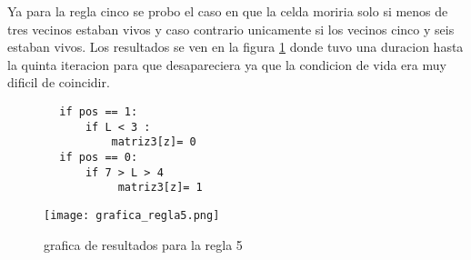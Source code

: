 \documentclass[a4paper, 11pt]{article}
\begin{document}
Ya para la regla cinco se probo el caso en que la celda moriria solo si menos de tres vecinos estaban vivos y caso contrario unicamente si los vecinos cinco y seis estaban vivos. Los resultados se ven en la figura \ref{regla5} donde tuvo una duracion hasta la quinta iteracion para que desapareciera ya que la condicion de vida era muy dificil de coincidir.
\begin{verbatim}
        if pos == 1:  
            if L < 3 : 
                matriz3[z]= 0           
        if pos == 0:
            if 7 > L > 4
                 matriz3[z]= 1 
\end{verbatim}

\begin{figure}[H]
  \centering      
  \caption{grafica de resultados para la regla 5}  
  \texttt{[image: grafica\_regla5.png]}
  \label{regla5}
\end{figure}




\end{document}
